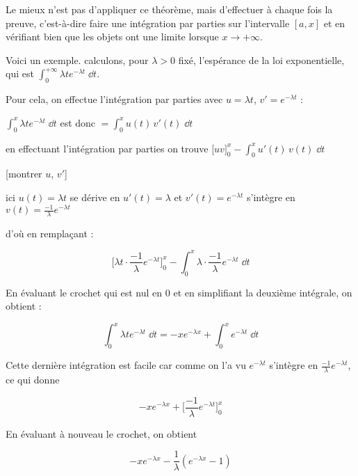 
Le mieux n'est pas d'appliquer ce théorème, 
mais d'effectuer à chaque fois la preuve,
c'est-à-dire faire une intégration par parties sur l'intervalle $[a,x]$ et
en vérifiant bien que les objets ont une limite lorsque $x\to+ \infty$.


\diapo

Voici un exemple. calculons, pour $\lambda >0$ fixé, 
l'espérance  de la loi exponentielle, qui est 
$\int_0^{+\infty} \lambda t e^{-\lambda t}\;\dd t$.

\change
Pour cela, on effectue l'intégration par 
parties avec $u = \lambda t$, $v' = e^{-\lambda t}$ : 

\change
$\int_0^{x} \lambda t e^{-\lambda t}\;\dd t$
est donc $= \int_0^{x} u(t) \, v'(t)\;\dd t  $


\change
en effectuant l'intégration par parties on trouve 
$\displaystyle \big[uv\big]_0^{x} - \int_0^{x} u'(t) \, v(t)\;\dd t $

[montrer $u$, $v'$]

ici $u(t) = \lambda t$ se dérive en $u'(t) = \lambda$
et $v'(t) = e^{-\lambda t}$ s'intègre en 
$v(t)= \frac{-1}{\lambda}e^{-\lambda t}$

\change
d'où en remplaçant :

$$\Big[ \lambda t \cdot \frac{-1}{\lambda}e^{-\lambda t}\Big]_0^{x} 
- \int_0^{x} \lambda \cdot  \frac{-1}{\lambda}e^{-\lambda t}\;\dd t $$

\change
En évaluant le crochet qui est nul en $0$ et en 
simplifiant la deuxième intégrale, on obtient :

 $$\int_0^{x} \lambda t e^{-\lambda t}\;\dd t  = -xe^{-\lambda x} + \int_0^{x} e^{-\lambda t} \;\dd t$$

\change
Cette dernière intégration est facile car 
comme on l'a vu $e^{-\lambda t}$ s'intègre en 
$\frac{-1}{\lambda}e^{-\lambda t}$, ce qui donne

$$-xe^{-\lambda x} + \Big[\frac{-1}{\lambda}e^{-\lambda t}\Big]_0^{x} $$

\change
En évaluant à nouveau le crochet, on obtient 

$$-xe^{-\lambda x}-\frac{1}{\lambda} \left(e^{-\lambda x} -1\right) $$
 
